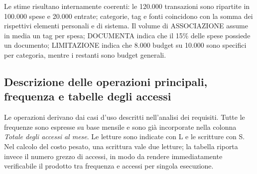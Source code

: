 \documentclass[11pt,a4paper]{article}
\begin{document}
Le stime risultano internamente coerenti: le 120.000 transazioni sono ripartite in 100.000 spese e 20.000 entrate; categorie, tag e fonti coincidono con la somma dei rispettivi elementi personali e di sistema. Il volume di \textsc{ASSOCIAZIONE} assume in media un tag per spesa; \textsc{DOCUMENTA} indica che il 15\% delle spese possiede un documento; \textsc{LIMITAZIONE} indica che 8.000 budget su 10.000 sono specifici per categoria, mentre i restanti sono budget generali.

\subsection{Descrizione delle operazioni principali, frequenza e tabelle degli accessi}
Le operazioni derivano dai casi d'uso descritti nell'analisi dei requisiti. Tutte le frequenze sono espresse su base mensile e sono già incorporate nella colonna \emph{Totale degli accessi al mese}. Le letture sono indicate con L e le scritture con S. Nel calcolo del costo pesato, una scrittura vale due letture; la tabella riporta invece il numero grezzo di accessi, in modo da rendere immediatamente verificabile il prodotto tra frequenza e accessi per singola esecuzione.
\end{document}
